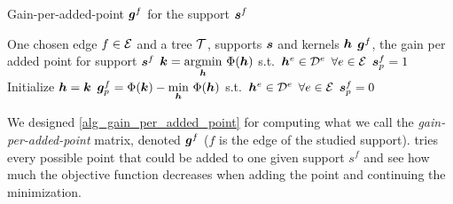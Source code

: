 \begin{algorithm}[!htb]
    \caption{Gain-per-added-point $\bm{g}^f$ for the support $\bm{s}^f$}\label{alg_gain_per_added_point}
  \begin{algorithmic}[1]
    \Input One chosen edge $f \in \mathcal E$ and a tree $\mathcal T$, supports $\bm{s}$ and kernels $\bm{h}$
    \Output $\bm{g}^f$, the gain per added point for support $\bm{s}^f$
    \State $\bm{k} = \underset{\bm{h}}{\operatorname{argmin}}~ \Phi (\bm{h})$ \quad s.t.~$\bm{h}^e \in {\mathcal D}^e$ \quad $\forall e \in \mathcal E$ 
    	\State $\bm{s}^f_p = 1$ 
    	\State Initialize $\bm{h} = \bm{k}$
    	\State $\bm{g}^f_p = \Phi(\bm{k}) - \underset{\bm{h}}{\min}~ \Phi (\bm{h})$ \quad s.t.~$\bm{h}^e \in {\mathcal D}^e$ \quad $\forall e \in \mathcal E$
    	\State $\bm{s}^f_p = 0$ 
    \EndFor
  \end{algorithmic}
\end{algorithm}

We designed \cref{alg_gain_per_added_point} for computing what we call the \emph{gain-per-added-point} matrix, denoted $\bm{g}^f$ ($f$ is the edge of the studied support).  tries every possible point that could be added to one given support $s^f$ and see how much the objective function decreases when adding the point and continuing the minimization.

